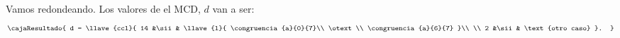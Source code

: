 Vamos redondeando. Los valores de el MCD, $d$ van a ser:
$$
  \cajaResultado{
    d =
    \llave{ccl}{
      14 &\sii&
      \llave{l}{
        \congruencia{a}{0}{7}\\
        \otext\\
        \congruencia{a}{6}{7}
      }\\
      \\
      2 &\sii& \text{otro caso}
    }.
  }
$$

\begin{aportes}
  \item {}
  \item {}
\end{aportes}

